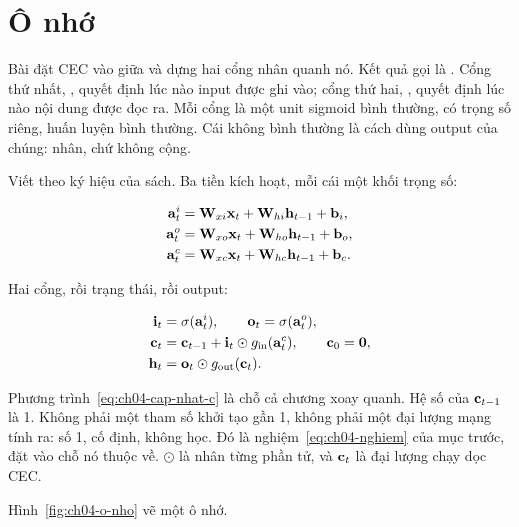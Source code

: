 \section{Ô nhớ}
\label{sec:ch04-o-nho}

%
Bài đặt CEC vào giữa và dựng hai cổng nhân quanh nó. Kết quả gọi là
. Cổng thứ nhất, , quyết định
lúc nào input được ghi vào; cổng thứ hai, , quyết định
lúc nào nội dung được đọc ra. Mỗi cổng là một unit sigmoid bình thường, có
trọng số riêng, huấn luyện bình thường. Cái không bình thường là cách dùng
output của chúng: nhân, chứ không cộng.

Viết theo ký hiệu của sách. Ba tiền kích hoạt, mỗi cái một khối trọng số:

\begin{align}
  \mathbf{a}^{i}_t &= \mathbf{W}_{xi}\mathbf{x}_t + \mathbf{W}_{hi}\mathbf{h}_{t-1} + \mathbf{b}_i,
  \label{eq:ch04-a-i} \\
  \mathbf{a}^{o}_t &= \mathbf{W}_{xo}\mathbf{x}_t + \mathbf{W}_{ho}\mathbf{h}_{t-1} + \mathbf{b}_o,
  \label{eq:ch04-a-o} \\
  \mathbf{a}^{c}_t &= \mathbf{W}_{xc}\mathbf{x}_t + \mathbf{W}_{hc}\mathbf{h}_{t-1} + \mathbf{b}_c.
  \label{eq:ch04-a-c}
\end{align}

Hai cổng, rồi trạng thái, rồi output:

\begin{align}
  \mathbf{i}_t &= \sigma(\mathbf{a}^{i}_t), \qquad
  \mathbf{o}_t = \sigma(\mathbf{a}^{o}_t),
  \label{eq:ch04-cong} \\
  \mathbf{c}_t &= \mathbf{c}_{t-1} + \mathbf{i}_t \odot g_{\mathrm{in}}(\mathbf{a}^{c}_t),
  \qquad \mathbf{c}_0 = \mathbf{0},
  \label{eq:ch04-cap-nhat-c} \\
  \mathbf{h}_t &= \mathbf{o}_t \odot g_{\mathrm{out}}(\mathbf{c}_t).
  \label{eq:ch04-h}
\end{align}

%
Phương trình~\eqref{eq:ch04-cap-nhat-c} là chỗ cả chương xoay quanh. Hệ số của
\(\mathbf{c}_{t-1}\) là 1. Không phải một tham số khởi tạo gần 1, không phải một
đại lượng mạng tính ra: số 1, cố định, không học. Đó là
nghiệm~\eqref{eq:ch04-nghiem} của mục trước, đặt vào chỗ nó thuộc về.
\(\odot\) là nhân từng phần tử, và 
\(\mathbf{c}_t\) là đại lượng chạy dọc CEC.

Hình~\ref{fig:ch04-o-nho} vẽ một ô nhớ.

